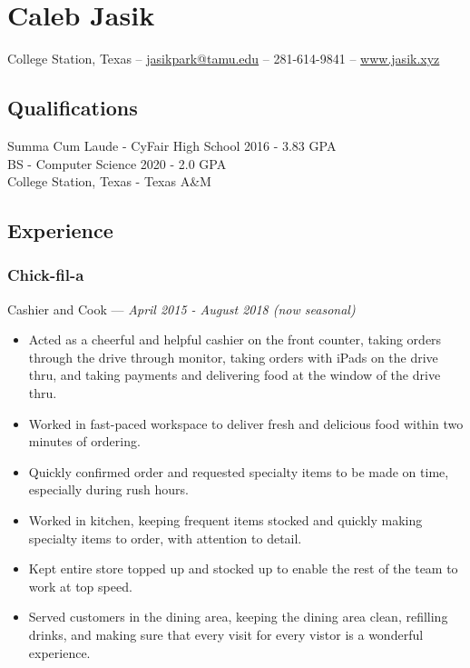 \documentclass[letterpaper,10pt]{article}
\begin{document}
\section{Caleb Jasik}

\hfill College Station, Texas --
\href{mailto:jasikpark@tamu.edu}{jasikpark@tamu.edu} --
281-614-9841 --
\href{https://jasik.xyz}{www.jasik.xyz}

\subsection{Qualifications}

Summa Cum Laude - CyFair High School 2016 - 3.83 GPA\\
BS - Computer Science 2020 - 2.0 GPA\\
College Station, Texas - Texas A\&M



\subsection{Experience}

\subsubsection{Chick-fil-a}
\hfill Cashier and Cook --- \emph{April 2015 - August 2018 (now seasonal)}

\begin{itemize}
\tightlist{}
\item
	Acted as a cheerful and helpful cashier on the front counter, taking orders through the drive through monitor, taking orders with iPads on the drive thru, and taking payments and delivering food at the window of the drive thru.
\item
	Worked in fast-paced workspace to deliver fresh and delicious food within two minutes of ordering.
\item
	Quickly confirmed order and requested specialty items to be made on time, especially during rush hours.
\item
	Worked in kitchen, keeping frequent items stocked and quickly making specialty items to order, with attention to detail.
\item
	Kept entire store topped up and stocked up to enable the rest of the team to work at top speed.
\item
	Served customers in the dining area, keeping the dining area clean, refilling drinks, and making sure that every visit for every vistor is a wonderful experience.\end{itemize}
\end{document}

